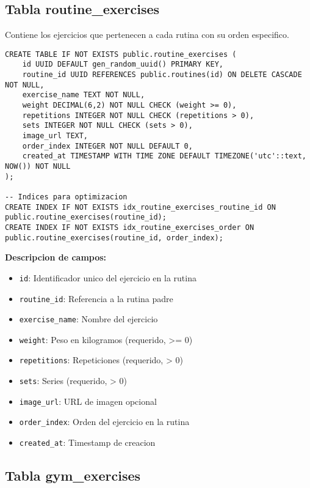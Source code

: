 \documentclass[12pt,a4paper]{article}
\begin{document}
\subsection{Tabla routine\_exercises}

Contiene los ejercicios que pertenecen a cada rutina con su orden especifico.

\begin{lstlisting}[style=sqlstyle, caption=Estructura completa de routine_exercises]
CREATE TABLE IF NOT EXISTS public.routine_exercises (
    id UUID DEFAULT gen_random_uuid() PRIMARY KEY,
    routine_id UUID REFERENCES public.routines(id) ON DELETE CASCADE NOT NULL,
    exercise_name TEXT NOT NULL,
    weight DECIMAL(6,2) NOT NULL CHECK (weight >= 0),
    repetitions INTEGER NOT NULL CHECK (repetitions > 0),
    sets INTEGER NOT NULL CHECK (sets > 0),
    image_url TEXT,
    order_index INTEGER NOT NULL DEFAULT 0,
    created_at TIMESTAMP WITH TIME ZONE DEFAULT TIMEZONE('utc'::text, NOW()) NOT NULL
);

-- Indices para optimizacion
CREATE INDEX IF NOT EXISTS idx_routine_exercises_routine_id ON public.routine_exercises(routine_id);
CREATE INDEX IF NOT EXISTS idx_routine_exercises_order ON public.routine_exercises(routine_id, order_index);
\end{lstlisting}

\textbf{Descripcion de campos:}
\begin{itemize}
    \item \texttt{id}: Identificador unico del ejercicio en la rutina
    \item \texttt{routine\_id}: Referencia a la rutina padre
    \item \texttt{exercise\_name}: Nombre del ejercicio
    \item \texttt{weight}: Peso en kilogramos (requerido, >= 0)
    \item \texttt{repetitions}: Repeticiones (requerido, > 0)
    \item \texttt{sets}: Series (requerido, > 0)
    \item \texttt{image\_url}: URL de imagen opcional
    \item \texttt{order\_index}: Orden del ejercicio en la rutina
    \item \texttt{created\_at}: Timestamp de creacion
\end{itemize}

\subsection{Tabla gym\_exercises}
\end{document}
